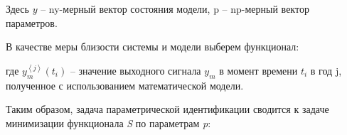 
Здесь \(y\) -- ny-мерный вектор состояния модели, p -- np-мерный вектор
параметров.

В качестве меры близости системы и модели выберем функционал:


где \(y_{m}^{\left\langle j \right\rangle}(t_{i})\) -- значение
выходного сигнала \(y_{m}\) в момент времени \(t_{i}\) в год j,
полученное с использованием математической модели.

Таким образом, задача параметрической идентификации сводится к задаче
минимизации функционала \emph{S} по параметрам \emph{p}:


